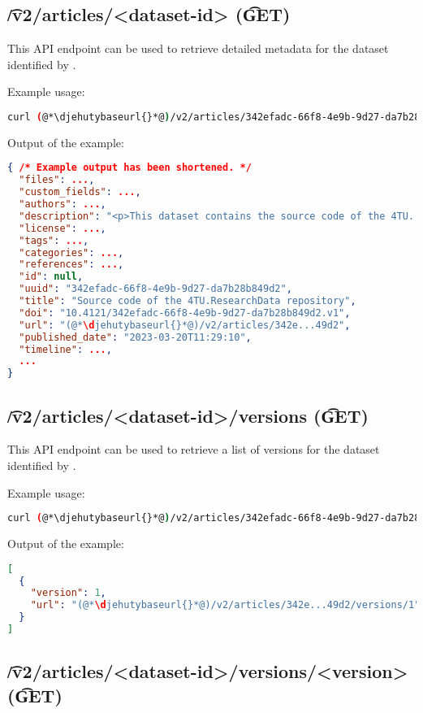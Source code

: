 \subsection{\t{/v2/articles/<dataset-id>} (\t{GET})}
\label{sec:v2-articles-dataset-id}

  This API endpoint can be used to retrieve detailed metadata for the dataset
  identified by .

  Example usage:
\begin{lstlisting}[language=bash]
curl (@*\djehutybaseurl{}*@)/v2/articles/342efadc-66f8-4e9b-9d27-da7b28b849d2 | jq
\end{lstlisting}

  Output of the example:
\begin{lstlisting}[language=JSON]
{ /* Example output has been shortened. */
  "files": ...,
  "custom_fields": ...,
  "authors": ...,
  "description": "<p>This dataset contains the source code of the 4TU...",
  "license": ...,
  "tags": ...,
  "categories": ...,
  "references": ...,
  "id": null,
  "uuid": "342efadc-66f8-4e9b-9d27-da7b28b849d2",
  "title": "Source code of the 4TU.ResearchData repository",
  "doi": "10.4121/342efadc-66f8-4e9b-9d27-da7b28b849d2.v1",
  "url": "(@*\djehutybaseurl{}*@)/v2/articles/342e...49d2",
  "published_date": "2023-03-20T11:29:10",
  "timeline": ...,
  ...
}
\end{lstlisting}

\subsection{\t{/v2/articles/<dataset-id>/versions} (\t{GET})}

  This API endpoint can be used to retrieve a list of versions for the dataset
  identified by .

  Example usage:
\begin{lstlisting}[language=bash]
curl (@*\djehutybaseurl{}*@)/v2/articles/342efadc-66f8-4e9b-9d27-da7b28b849d2/versions | jq
\end{lstlisting}

  Output of the example:
\begin{lstlisting}[language=JSON]
[
  {
    "version": 1,
    "url": "(@*\djehutybaseurl{}*@)/v2/articles/342e...49d2/versions/1"
  }
]
\end{lstlisting}

\subsection{\t{/v2/articles/<dataset-id>/versions/<version>} (\t{GET})}

